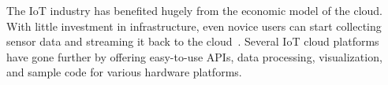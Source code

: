 The IoT industry has benefited hugely from the economic model of the cloud.
With little investment in infrastructure, even novice users can start collecting
sensor data and streaming it back to the cloud~\cite{armbrust2010view}.  Several
IoT cloud platforms~\cite{carriots, grovestreams, xively, sami} have gone
further by offering easy-to-use APIs, data processing, visualization, and sample
code for various hardware platforms.

